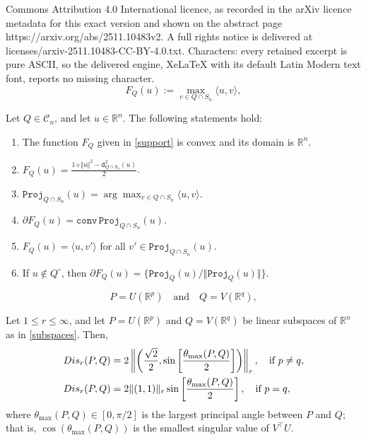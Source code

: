\documentclass[10pt,a4paper]{amsart}
\newcommand{\RR}{\mathbb R}
\newcommand{\R}{\mathbb R}
\newcommand{\dist}{\mathtt{d}}
\newcommand{\inner}[2]{\langle#1,#2\rangle}
\newcommand{\norm}[1]{\textstyle{\Vert} #1 \textstyle{\Vert}}
\newcommand{\proj}{\mathtt{Proj}}
\begin{document}
Commons Attribution 4.0 International licence, as recorded in the arXiv licence metadata for this exact version and shown on the abstract page https://arxiv.org/abs/2511.10483v2. A full rights notice is delivered at licenses/arxiv-2511.10483-CC-BY-4.0.txt. Characters: every retained excerpt is pure ASCII, so the delivered engine, XeLaTeX with its default Latin Modern text font, reports no missing character.
\begin{equation}\label{support}
F_Q(u):=\max_{v\in Q\cap S_n}\langle u,v\rangle,
\end{equation}

\begin{proposition}\label{prop FQ}
Let $Q\in\mathcal C_n$, and let $u\in\R^n$. The following statements hold:
\begin{enumerate}
\item[(a)] The function $F_Q$ given in \eqref{support} is convex and its domain is $\R^n$.
\item[(b)]  $\displaystyle F_Q(u)=\frac{1+\norm{u}^2-\dist_{Q\cap S_n}^2(u)}{2}$.
\item[(c)] $\proj_{Q\cap S_n}(u)=\arg\max_{v \in Q\cap S_n} \inner{u}{v}$.
\item[(d)] $\partial F_Q(u) = \mathtt{conv}\, \proj_{Q\cap S_n}(u)$.
\item[(e)] $F_Q(u) = \inner{u}{v'}$ for all $v'\in \proj_{Q\cap S_n}(u)$.
\item[(f)] If $u \notin Q^\circ$, then $\partial F_Q(u)=\{\proj_Q(u)/\Vert \proj_Q(u)\Vert\}$. 
\end{enumerate}
\end{proposition}

\begin{equation}\label{subspaces}
P=U(\RR^p)\quad\text{and}\quad Q=V(\R^q),
\end{equation}

\begin{theorem}
Let $1\leq r\leq\infty$, and let $P=U(\R^p)$  and $Q=V(\R^q)$ be linear subspaces of $\R^n$ as in \eqref{subspaces}. Then,
\begin{align*}
&\displaystyle {\rm Dis}_r(P,Q)= 2\left\Vert\left(\frac{\sqrt{2}}{2}, \sin\left[\frac{\theta_{\max}(P,Q)}{2}\right]\right)\right\Vert_r,\quad\text{if }p \neq q,\\
&\displaystyle {\rm Dis}_r(P,Q)= 2\Vert(1,1)\Vert_r\sin\left[\frac{\theta_{\max}(P,Q)}{2}\right],\quad\text{if } p=q,
\end{align*}
where $\theta_{\max}(P,Q)\in[0,\pi/2]$ is the largest principal angle between $P$ and $Q$; that is, $\cos(\theta_{\max}(P,Q))$ is the smallest singular value of $V^\top U$.

\end{theorem}
\end{document}
